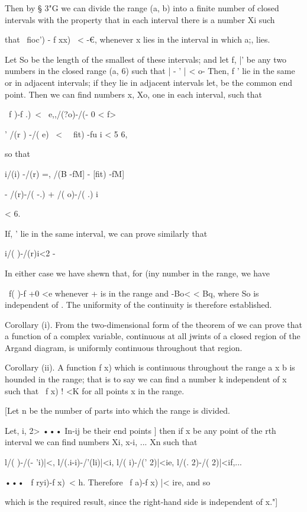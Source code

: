 Then by § 3"G we can divide the range (a, b) into a finite number of
closed intervals with the property that in each interval there is a
number Xi such

that \ fioc') - f xx) \ < -€, whenever x lies in the interval in which
a;, lies.

Let So be the length of the smallest of these intervals; and let f,
|' be any two numbers in the closed range (a, 6) such that | - ' | <
o- Then, f ' lie in the same or in adjacent intervals; if they lie
in adjacent intervals let, be the common end point. Then we can find
numbers x, Xo, one in each interval, such that

\ f )-f .)\ < \ e,,/(?o)-/(- 0 < f>

' /(r ) -/( e) \ < \ \, fit) -fu i < 5 6,

so that

i/(i) -/(r) =, /(B -fM] - [fit) -fM]

- /(r)-/( -.) + /( o)-/( .) i

< 6.

If, ' lie in the same interval, we can prove similarly that

i/( )-/(r)i<2 -

In either case we have shewn that, for (iny number in the range, we
have

\ f( )-f +0 <e whenever + is in the range and -Bo< < Bq, where So is
independent of . The uniformity of the continuity is therefore
established.

Corollary (i). From the two-dimensional form of the theorem of
we can prove that a function of a complex variable, continuous at all
jwints of a closed region of the Argand diagram, is uniformly
continuous throughout that region.

Corollary (ii). A function f x) which is continuous throughout the
range a x b is hounded in the range; that is to say we can find a
number k independent of x such that \ f x) ! <K for all points x in
the range.

[Let n be the number of parts into which the range is divided.

Let, i, 2> ••• In-ij be their end points ] then if x be any point of
the rth interval we can find numbers Xi, x-i, ... Xn such that

l/( )-/(- 'i)|<, l/(.i-i)-/'(li)|<i, l/( i)-/(' 2)|<ie, l/(. 2)-/(
2)|<if,...

••• \ f ryi)-f x)\ < h. Therefore \ f a)-f x) |< ire, and so

which is the required result, since the right-hand side is independent
of x."]

